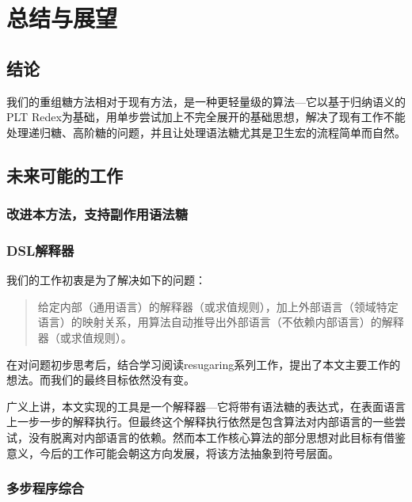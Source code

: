 \pagestyle{fancy}
\normalsize
\linespread{1.5}\selectfont
\chapter{总结与展望}
\section{结论}
我们的重组糖方法相对于现有方法，是一种更轻量级的算法---它以基于归纳语义的PLT Redex为基础，用单步尝试加上不完全展开的基础思想，解决了现有工作不能处理递归糖、高阶糖的问题，并且让处理语法糖尤其是卫生宏的流程简单而自然。

\section{未来可能的工作}

\subsection{改进本方法，支持副作用语法糖}

\subsection{DSL解释器}
我们的工作初衷是为了解决如下的问题：

\begin{quote}
	给定内部（通用语言）的解释器（或求值规则），加上外部语言（领域特定语言）的映射关系，用算法自动推导出外部语言（不依赖内部语言）的解释器（或求值规则）。
\end{quote}

在对问题初步思考后，结合学习阅读resugaring系列工作，提出了本文主要工作的想法。而我们的最终目标依然没有变。

广义上讲，本文实现的工具是一个解释器---它将带有语法糖的表达式，在表面语言上一步一步的解释执行。但最终这个解释执行依然是包含算法对内部语言的一些尝试，没有脱离对内部语言的依赖。然而本工作核心算法的部分思想对此目标有借鉴意义，今后的工作可能会朝这方向发展，将该方法抽象到符号层面。

\subsection{多步程序综合}

